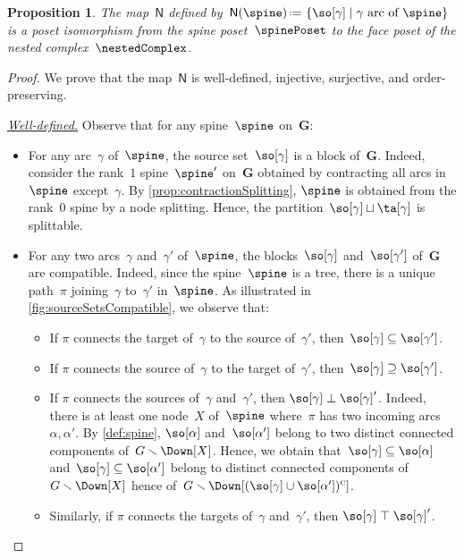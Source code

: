 \documentclass{amsart}
\newtheorem{proposition}[theorem]{Proposition}
\theoremstyle{definition}
\renewcommand{\b}[1]{{\boldsymbol{#1}}} %
\newcommand{\set}[2]{\left\{ #1 \;\middle|\; #2 \right\}} %
\newcommand{\ssm}{\smallsetminus} %
\newcommand{\eqdef}{\mbox{\,\raisebox{0.2ex}{\scriptsize\ensuremath{\mathrm:}}\ensuremath{=}\,}} %
\newcommand{\para}[1]{\medskip\noindent\uline{\textit{#1.}}} %
\newcommand{\vincent}[1]{\todo[color=blue!30]{#1 \\ \hfill --- V.}}
\newcommand{\negDisjoint}{\perp} %
\newcommand{\posDisjoint}{\;\top\;} %
\newcommand{\compl}[1]{#1{}^\textsc{c}} %
\newcommand{\spineToNested}{\mathsf{N}} %
\begin{document}
\begin{proposition}
  \label{prop:spineToNested}
  The map~$\spineToNested$ defined by~$\spineToNested(\spine) \eqdef \set{\so[\gamma]}{\gamma \text{ arc of } \spine}$ is a poset isomorphism from the spine poset~$\spinePoset$ to the face poset of the nested complex~$\nestedComplex$.
\end{proposition}

\begin{proof}
  We prove that the map~$\spineToNested$ is well-defined, injective, surjective, and order-preserving.
  
  \para{Well-defined}
  Observe that for any spine~$\spine$ on~$\b{G}$:
  \begin{itemize}
    \item For any arc~$\gamma$ of~$\spine$, the source set~$\so[\gamma]$ is a block of~$\b{G}$. 
    Indeed, consider the rank~$1$ spine~$\spine'$ on~$\b{G}$ obtained by contracting all arcs in~$\spine$ except~$\gamma$. 
    By \cref{prop:contractionSplitting}, $\spine$ is obtained from the rank~$0$ spine by a node splitting. 
    Hence, the partition~$\so[\gamma] \sqcup \ta[\gamma]$ is splittable.
    \item For any two arcs~$\gamma$ and~$\gamma'$ of~$\spine$, the blocks~$\so[\gamma]$ and~$\so[\gamma']$ of~$\b{G}$ are compatible. 
    Indeed, since the spine~$\spine$ is a tree, there is a unique path~$\pi$ joining~$\gamma$ to~$\gamma'$ in~$\spine$.
    As illustrated in \cref{fig:sourceSetsCompatible}, we observe that:
    \vincent{borrow picture...}
    \begin{itemize}
      \item If $\pi$ connects the target of~$\gamma$ to the source of~$\gamma'$, then~$\so[\gamma] \subseteq \so[\gamma']$.
      \item If $\pi$ connects the source of~$\gamma$ to the target of~$\gamma'$, then~$\so[\gamma] \supseteq \so[\gamma']$.
      \item If $\pi$ connects the sources of~$\gamma$ and~$\gamma'$, then $\so[\gamma] \negDisjoint \so[\gamma]'$.
      Indeed, there is at least one node~$X$ of~$\spine$ where~$\pi$ has two incoming arcs~$\alpha, \alpha'$.
      By \cref{def:spine}, $\so[\alpha]$ and~$\so[\alpha']$ belong to two distinct connected components of~$G \ssm \Down[X]$.
      Hence, we obtain that~$\so[\gamma] \subseteq \so[\alpha]$ and~$\so[\gamma] \subseteq \so[\alpha']$ belong to distinct connected components of~$G \ssm \Down[X]$ hence of~$G \ssm \Down[\compl{(\so[\gamma] \cup \so[\alpha'])}]$.
      \item Similarly, if $\pi$ connects the targets of~$\gamma$ and~$\gamma'$, then $\so[\gamma] \posDisjoint \so[\gamma]'$.
    \end{itemize}
  \end{itemize}


\end{proof}
\end{document}
